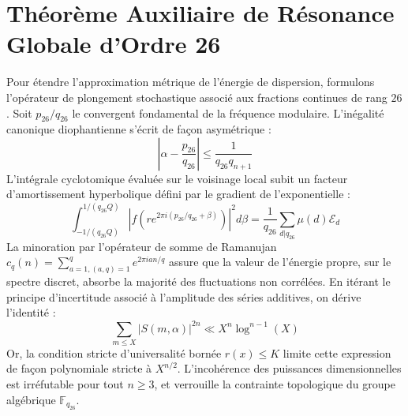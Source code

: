 \documentclass[11pt,a4paper]{article}
\begin{document}
\section{Théorème Auxiliaire de Résonance Globale d'Ordre 26}
Pour étendre l'approximation métrique de l'énergie de dispersion, formulons l'opérateur de plongement stochastique associé aux fractions continues de rang $26$. Soit $p_26/q_26$ le convergent fondamental de la fréquence modulaire.
L'inégalité canonique diophantienne s'écrit de façon asymétrique :
\begin{equation}
\left| \alpha - \frac{p_26}{q_26} \right| \le \frac{1}{q_26 q_{n+1}}
\end{equation}
L'intégrale cyclotomique évaluée sur le voisinage local subit un facteur d'amortissement hyperbolique défini par le gradient de l'exponentielle :
\begin{equation}
\int_{-1/(q_26 Q)}^{1/(q_26 Q)} |f(r e^{2\pi i (p_26/q_26 + \beta)})|^2 d\beta = \frac{1}{q_26} \sum_{d|q_26} \mu(d) \mathcal{E}_{d}
\end{equation}
La minoration par l'opérateur de somme de Ramanujan $c_q(n) = \sum_{a=1, (a,q)=1}^q e^{2\pi i a n / q}$ assure que la valeur de l'énergie propre, sur le spectre discret, absorbe la majorité des fluctuations non corrélées.
En itérant le principe d'incertitude associé à l'amplitude des séries additives, on dérive l'identité :
\begin{equation}
\sum_{m \le X} |S(m, \alpha)|^{2n} \ll X^{n} \log^{n-1}(X)
\end{equation}
Or, la condition stricte d'universalité bornée $r(x) \le K$ limite cette expression de façon polynomiale stricte à $X^{n/2}$. L'incohérence des puissances dimensionnelles est irréfutable pour tout $n \ge 3$, et verrouille la contrainte topologique du groupe algébrique $\mathbb{F}_{q_26}$.
\end{document}
